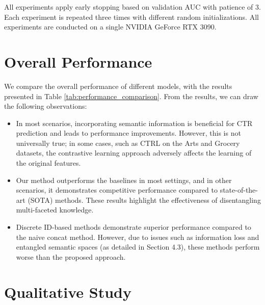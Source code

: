 All experiments apply early stopping based on validation AUC with patience of 3. Each experiment is repeated three times with different random initializations. All experiments are conducted on a single NVIDIA GeForce RTX 3090.


\section{Overall Performance}



We compare the overall performance of different models, with the results presented in Table \ref{tab:performance_comparison}. From the results, we can draw the following observations:
\begin{itemize}
    \item In most scenarios, incorporating semantic information is beneficial for CTR prediction and leads to performance improvements. However, this is not universally true; in some cases, such as CTRL on the Arts and Grocery datasets, the contrastive learning approach adversely affects the learning of the original features.
    \item Our method outperforms the baselines in most settings, and in other scenarios, it demonstrates competitive performance compared to state-of-the-art (SOTA) methods. These results highlight the effectiveness of disentangling multi-faceted knowledge.
    \item Discrete ID-based methods demonstrate superior performance compared to the naive concat method. However, due to issues such as information loss \cite{zhang2024towards} and entangled semantic spaces (as detailed in Section 4.3), these methods perform worse than the proposed approach.
\end{itemize}


\section{Qualitative Study}



